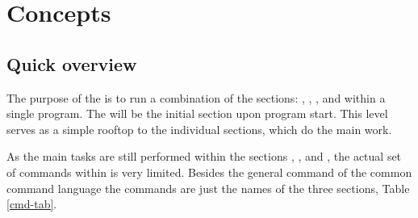 
\chapter{Concepts \label{concepts}}
\section{Quick overview } 

The purpose of the \Suite is to run a combination of the sections: 
\href{./diffev\_man.pdf}\diffev, 
\href{./discus\_man.pdf}\discus,
\href{./refine\_man.pdf}, 
and 
\href{./kuplot\_man.pdf}\Kuplot within a single program. The \Suite 
will be the initial section upon program start. This level serves
as a simple rooftop to the individual sections, which do the main
work. 



As the main tasks are still performed within the sections \diffev, \discus,
 and \kuplot, the actual set of commands within \Suite is very limited. 
Besides the general command of the common command language the commands are
just the names of the three sections, Table \ref{cmd-tab}.

